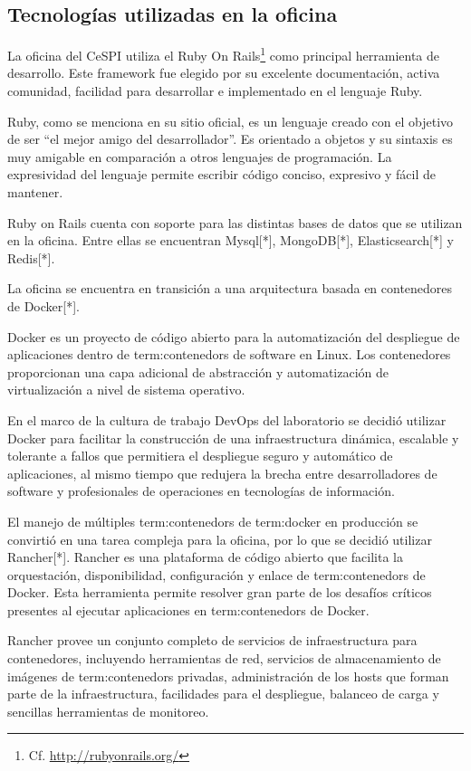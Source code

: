 \subsection{Tecnologías utilizadas en la oficina}
\label{tecnologias_utilizadas}

La oficina del CeSPI utiliza el   Ruby On
Rails\footnote{Cf.  \url{http://rubyonrails.org/}} como principal herramienta
de desarrollo. Este framework fue elegido por su excelente documentación,
activa comunidad, facilidad para desarrollar e implementado en el lenguaje
Ruby.

Ruby, como se menciona en su sitio oficial, es un lenguaje creado con el
objetivo de ser “el mejor amigo del desarrollador”. Es orientado a objetos y su
sintaxis es muy amigable en comparación a otros lenguajes de programación. La
expresividad del lenguaje permite escribir código conciso, expresivo y fácil de
mantener.

Ruby on Rails cuenta con soporte para las distintas bases de datos que se
utilizan en la oficina. Entre ellas se encuentran Mysql[*], MongoDB[*],
Elasticsearch[*] y Redis[*].

La oficina se encuentra en transición a una arquitectura basada en contenedores
de Docker[*].

Docker es un proyecto de código abierto para la automatización del despliegue
de aplicaciones dentro de \glspl{term:contenedor} de software en Linux. Los contenedores
proporcionan una capa adicional de abstracción y automatización de
virtualización a nivel de sistema operativo.

En el marco de la cultura de trabajo DevOps del laboratorio se decidió utilizar
Docker para facilitar la construcción de una infraestructura dinámica,
escalable y tolerante a fallos que permitiera el despliegue seguro y automático
de aplicaciones, al mismo tiempo que redujera la brecha entre desarrolladores
de software y profesionales de operaciones en tecnologías de información.

El manejo de múltiples \glspl{term:contenedor} de \gls{term:docker} en producción se convirtió en una
tarea compleja para la oficina, por lo que se decidió utilizar Rancher[*].
Rancher es una plataforma de código abierto que facilita la orquestación,
disponibilidad, configuración y enlace de \glspl{term:contenedor} de Docker. Esta
herramienta permite resolver gran parte de los desafíos críticos presentes al
ejecutar aplicaciones en \glspl{term:contenedor} de Docker.

Rancher provee un conjunto completo de servicios de infraestructura para
contenedores, incluyendo herramientas de red, servicios de almacenamiento de
imágenes de \glspl{term:contenedor} privadas, administración de los hosts que forman parte
de la infraestructura, facilidades para el despliegue, balanceo de carga y
sencillas herramientas de monitoreo.
